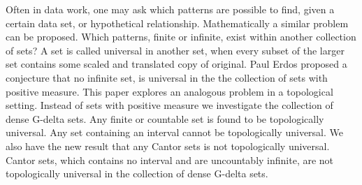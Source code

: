 \documentclass{amsart}
\begin{document}
Often in data work, one may ask which patterns are possible to find, given a certain data set, or hypothetical relationship.  Mathematically a similar problem can be proposed.  Which patterns, finite or infinite, exist within another collection of sets?  A set is called universal in another set, when every subset of the larger set contains some scaled and translated copy of original.  Paul Erdos proposed a conjecture that no infinite set, is universal in the the collection of sets with positive measure.  This paper explores an analogous problem in a topological setting. Instead of sets with positive measure we investigate the collection of dense G-delta sets.  Any finite or countable set is found to be topologically universal.  Any set containing an interval cannot be topologically universal.  We also have the new result that any Cantor sets is not topologically universal.  Cantor sets, which contains no interval and are uncountably infinite, are not topologically universal in the collection of dense G-delta sets.  

\end{document}
